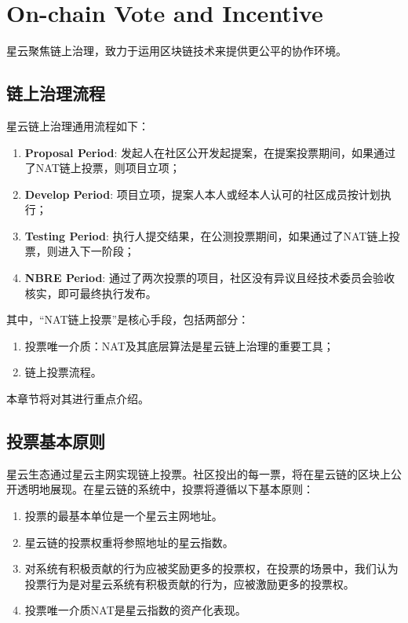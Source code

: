 \section{On-chain Vote and Incentive}

星云聚焦链上治理，致力于运用区块链技术来提供更公平的协作环境。

\subsection{链上治理流程}
\label{governance}

星云链上治理通用流程如下：

\begin{enumerate}
	\item \textbf{Proposal Period}: 发起人在社区公开发起提案，在提案投票期间，如果通过了NAT链上投票，则项目立项；
	\item \textbf{Develop Period}: 项目立项，提案人本人或经本人认可的社区成员按计划执行；
	\item \textbf{Testing Period}: 执行人提交结果，在公测投票期间，如果通过了NAT链上投票，则进入下一阶段；
	\item \textbf{NBRE Period}: 通过了两次投票的项目，社区没有异议且经技术委员会验收核实，即可最终执行发布。
\end{enumerate}

其中，“NAT链上投票”是核心手段，包括两部分：

\begin{enumerate}
	\item 投票唯一介质：NAT及其底层算法是星云链上治理的重要工具；
	\item 链上投票流程。
\end{enumerate}

本章节将对其进行重点介绍。

\subsection{投票基本原则}

星云生态通过星云主网实现链上投票。社区投出的每一票，将在星云链的区块上公开透明地展现。在星云链的系统中，投票将遵循以下基本原则：

\begin{enumerate}
	\item 投票的最基本单位是一个星云主网地址。
	\item 星云链的投票权重将参照地址的星云指数。
	\item 对系统有积极贡献的行为应被奖励更多的投票权，在投票的场景中，我们认为投票行为是对星云系统有积极贡献的行为，应被激励更多的投票权。
	\item 投票唯一介质NAT是星云指数的资产化表现。
\end{enumerate}

